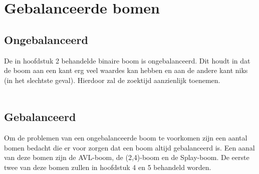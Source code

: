 \chapter{Gebalanceerde bomen}
\label{sec:Hoofdstuk 3}

\section{Ongebalanceerd}
De in hoofdstuk 2 behandelde binaire boom is ongebalanceerd. Dit houdt in dat de boom aan een kant erg veel waardes kan hebben en aan de andere kant niks (in het slechtste geval). Hierdoor zal de zoektijd aanzienlijk toenemen.\\
\\
\section{Gebalanceerd}
Om de problemen van een ongebalanceerde boom te voorkomen zijn een aantal bomen bedacht die er voor zorgen dat een boom altijd gebalanceerd is. Een aanal van deze bomen zijn de AVL-boom, de (2,4)-boom en de Splay-boom. De eerste twee van deze bomen zullen in hoofdstuk 4 en 5 behandeld worden.\\

